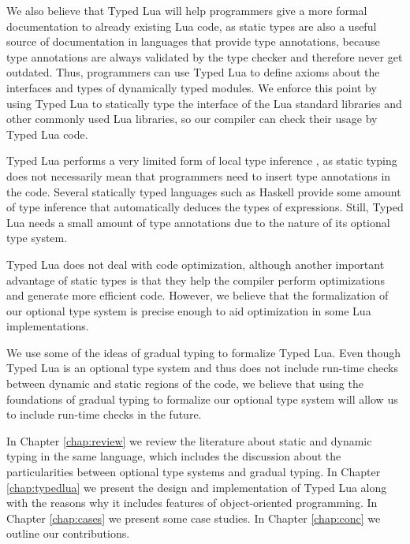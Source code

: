 We also believe that Typed Lua will help programmers give a more
formal documentation to already existing Lua code, as static types
are also a useful source of documentation in languages that provide
type annotations, because type annotations are always validated by
the type checker and therefore never get outdated.
Thus, programmers can use Typed Lua to define axioms about the
interfaces and types of dynamically typed modules.
We enforce this point by using Typed Lua to statically type
the interface of the Lua standard libraries and other commonly used
Lua libraries, so our compiler can check their usage by Typed Lua
code.

Typed Lua performs a very limited form of local type inference
\citep{pierce2000lti}, as static typing does not necessarily mean
that programmers need to insert type annotations in the code.
Several statically typed languages such as Haskell provide some
amount of type inference that automatically deduces the types of
expressions.
Still, Typed Lua needs a small amount of type annotations due
to the nature of its optional type system.

Typed Lua does not deal with code optimization, although another
important advantage of static types is that they help the compiler
perform optimizations and generate more efficient code.
However, we believe that the formalization of our optional type
system is precise enough to aid optimization in some Lua implementations.

We use some of the ideas of gradual typing to formalize Typed Lua.
Even though Typed Lua is an optional type system and thus does not
include run-time checks between dynamic and static regions of the
code, we believe that using the foundations of gradual typing to
formalize our optional type system will allow us to include run-time
checks in the future.

In Chapter \ref{chap:review} we review the literature about static and
dynamic typing in the same language, which includes the discussion
about the particularities between optional type systems and gradual
typing.
In Chapter \ref{chap:typedlua} we present the design and implementation
of Typed Lua along with the reasons why it includes features of
object-oriented programming.
In Chapter \ref{chap:cases} we present some case studies.
In Chapter \ref{chap:conc} we outline our contributions.

